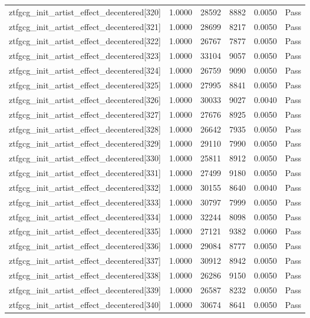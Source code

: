 \begin{table}[htbp]
\begin{tabular}{llrrll}
ztfgcg\_init\_artist\_effect\_decentered[320] & 1.0000 & 28592 & 8882 & 0.0050 & Pass \\
ztfgcg\_init\_artist\_effect\_decentered[321] & 1.0000 & 28699 & 8217 & 0.0050 & Pass \\
ztfgcg\_init\_artist\_effect\_decentered[322] & 1.0000 & 26767 & 7877 & 0.0050 & Pass \\
ztfgcg\_init\_artist\_effect\_decentered[323] & 1.0000 & 33104 & 9057 & 0.0050 & Pass \\
ztfgcg\_init\_artist\_effect\_decentered[324] & 1.0000 & 26759 & 9090 & 0.0050 & Pass \\
ztfgcg\_init\_artist\_effect\_decentered[325] & 1.0000 & 27995 & 8841 & 0.0050 & Pass \\
ztfgcg\_init\_artist\_effect\_decentered[326] & 1.0000 & 30033 & 9027 & 0.0040 & Pass \\
ztfgcg\_init\_artist\_effect\_decentered[327] & 1.0000 & 27676 & 8925 & 0.0050 & Pass \\
ztfgcg\_init\_artist\_effect\_decentered[328] & 1.0000 & 26642 & 7935 & 0.0050 & Pass \\
ztfgcg\_init\_artist\_effect\_decentered[329] & 1.0000 & 29110 & 7990 & 0.0050 & Pass \\
ztfgcg\_init\_artist\_effect\_decentered[330] & 1.0000 & 25811 & 8912 & 0.0050 & Pass \\
ztfgcg\_init\_artist\_effect\_decentered[331] & 1.0000 & 27499 & 9180 & 0.0050 & Pass \\
ztfgcg\_init\_artist\_effect\_decentered[332] & 1.0000 & 30155 & 8640 & 0.0040 & Pass \\
ztfgcg\_init\_artist\_effect\_decentered[333] & 1.0000 & 30797 & 7999 & 0.0050 & Pass \\
ztfgcg\_init\_artist\_effect\_decentered[334] & 1.0000 & 32244 & 8098 & 0.0050 & Pass \\
ztfgcg\_init\_artist\_effect\_decentered[335] & 1.0000 & 27121 & 9382 & 0.0060 & Pass \\
ztfgcg\_init\_artist\_effect\_decentered[336] & 1.0000 & 29084 & 8777 & 0.0050 & Pass \\
ztfgcg\_init\_artist\_effect\_decentered[337] & 1.0000 & 30912 & 8942 & 0.0050 & Pass \\
ztfgcg\_init\_artist\_effect\_decentered[338] & 1.0000 & 26286 & 9150 & 0.0050 & Pass \\
ztfgcg\_init\_artist\_effect\_decentered[339] & 1.0000 & 26587 & 8232 & 0.0050 & Pass \\
ztfgcg\_init\_artist\_effect\_decentered[340] & 1.0000 & 30674 & 8641 & 0.0050 & Pass \\

\end{tabular}
\end{table}
